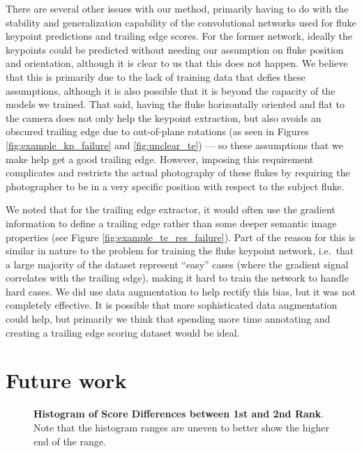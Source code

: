 There are several other issues with our method, primarily having to do with the stability and generalization capability of the convolutional networks used for fluke keypoint predictions and trailing edge scores.
For the former network, ideally the keypoints could be predicted without needing our assumption on fluke position and orientation, although it is clear to us that this does not happen.
We believe that this is primarily due to the lack of training data that defies these assumptions, although it is also possible that it is beyond the capacity of the models we trained.
That said, having the fluke horizontally oriented and flat to the camera does not only help the keypoint extraction, but also avoids an obscured trailing edge due to out-of-plane rotations (as seen in Figures \ref{fig:example_kp_failure} and \ref{fig:unclear_te}) --- so these assumptions that we make help get a good trailing edge.
However, imposing this requirement complicates and restricts the actual photography of these flukes by requiring the photographer to be in a very specific position with respect to the subject fluke.

We noted that for the trailing edge extractor, it would often use the gradient information to define a trailing edge rather than some deeper semantic image properties (see Figure \ref{fig:example_te_res_failure}).
Part of the reason for this is similar in nature to the problem for training the fluke keypoint network, i.e.\ that a large majority of the dataset represent ``easy'' cases (where the gradient signal correlates with the trailing edge), making it hard to train the network to handle hard cases.
We did use data augmentation to help rectify this bias, but it was not completely effective.
It is possible that more sophisticated data augmentation could help, but primarily we think that spending more time annotating and creating a trailing edge scoring dataset would be ideal.

\section{Future work}

\begin{figure*}[t]%
\centering
{}
\caption{\textbf{Histogram of Score Differences between 1st and 2nd Rank}. Note that the histogram ranges are uneven to better show the higher	end of the range.}
\label{fig:score_diff1st2nd}
\end{figure*}



